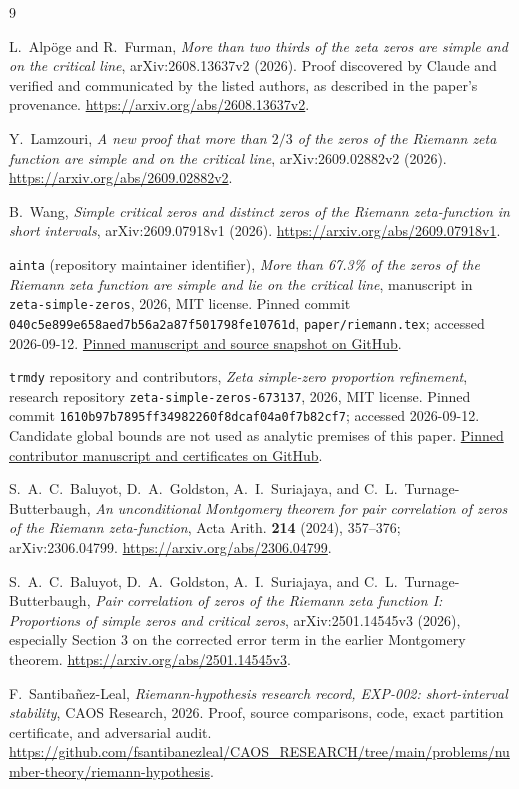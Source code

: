 \documentclass[11pt]{article}
\theoremstyle{remark}
\begin{document}
\begin{thebibliography}{9}\small\raggedright

L.~Alp\"oge and R.~Furman,
\emph{More than two thirds of the zeta zeros are simple and on the
critical line}, arXiv:2608.13637v2 (2026).
Proof discovered by Claude and verified and communicated by the listed
authors, as described in the paper's provenance.
\url{https://arxiv.org/abs/2608.13637v2}.

Y.~Lamzouri,
\emph{A new proof that more than $2/3$ of the zeros of the Riemann zeta
function are simple and on the critical line}, arXiv:2609.02882v2 (2026).
\url{https://arxiv.org/abs/2609.02882v2}.

B.~Wang,
\emph{Simple critical zeros and distinct zeros of the Riemann
zeta-function in short intervals}, arXiv:2609.07918v1 (2026).
\url{https://arxiv.org/abs/2609.07918v1}.

\texttt{ainta} (repository maintainer identifier),
\emph{More than 67.3\% of the zeros of the Riemann zeta function are
simple and lie on the critical line}, manuscript in
\texttt{zeta-simple-zeros}, 2026, MIT license.
Pinned commit \texttt{040c5e899e658aed7b56a2a87f501798fe10761d},
\texttt{paper/riemann.tex}; accessed 2026-09-12.
\href{https://github.com/ainta/zeta-simple-zeros/tree/040c5e899e658aed7b56a2a87f501798fe10761d}{Pinned manuscript and source snapshot on GitHub}.

\texttt{trmdy} repository and contributors,
\emph{Zeta simple-zero proportion refinement}, research repository
\texttt{zeta-simple-zeros-673137}, 2026, MIT license.
Pinned commit \texttt{1610b97b7895ff34982260f8dcaf04a0f7b82cf7};
accessed 2026-09-12. Candidate global bounds are not used as analytic
premises of this paper.
\href{https://github.com/trmdy/zeta-simple-zeros-673137/tree/1610b97b7895ff34982260f8dcaf04a0f7b82cf7}{Pinned contributor manuscript and certificates on GitHub}.

S.~A.~C.~Baluyot, D.~A.~Goldston, A.~I.~Suriajaya, and C.~L.~Turnage-Butterbaugh,
\emph{An unconditional Montgomery theorem for pair correlation of zeros
of the Riemann zeta-function}, Acta Arith. \textbf{214} (2024), 357--376;
arXiv:2306.04799.
\url{https://arxiv.org/abs/2306.04799}.

S.~A.~C.~Baluyot, D.~A.~Goldston, A.~I.~Suriajaya, and C.~L.~Turnage-Butterbaugh,
\emph{Pair correlation of zeros of the Riemann zeta function I:
Proportions of simple zeros and critical zeros},
arXiv:2501.14545v3 (2026), especially Section 3 on the
corrected error term in the earlier Montgomery theorem.
\url{https://arxiv.org/abs/2501.14545v3}.

F.~Santiba\~nez-Leal,
\emph{Riemann-hypothesis research record, EXP-002: short-interval
stability}, CAOS Research, 2026. Proof, source comparisons, code, exact
partition certificate, and adversarial audit.
\url{https://github.com/fsantibanezleal/CAOS_RESEARCH/tree/main/problems/number-theory/riemann-hypothesis}.

\end{thebibliography}
\end{document}
